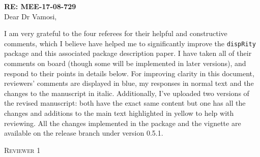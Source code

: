 \documentclass[12pt,letterpaper]{article}
\renewcommand{\section}[1]{%
\bigskip
\begin{center}
\begin{Large}
\normalfont\scshape #1
\medskip
\end{Large}
\end{center}}
\begin{document}
\textbf{RE: MEE-17-08-729 }\\
\bigskip
Dear Dr Vamosi,\\
\bigskip

I am very grateful to the four referees for their helpful and constructive comments, which I believe have helped me to significantly improve the \texttt{dispRity} package and this associated package description paper.
I have taken all of their comments on board (though some will be implemented in later versions), and respond to their points in details below.
For improving clarity in this document, reviewers' comments are displayed in blue, my responses in normal text and the changes to the manuscript in italic.
Additionally, I've uploaded two versions of the revised manuscript: both have the exact same content but one has all the changes and additions to the main text highlighted in yellow to help with reviewing.
All the changes implemented in the package and the vignette are available on the release branch under version 0.5.1.

%
%


\section{Reviewer 1}
\end{document}
